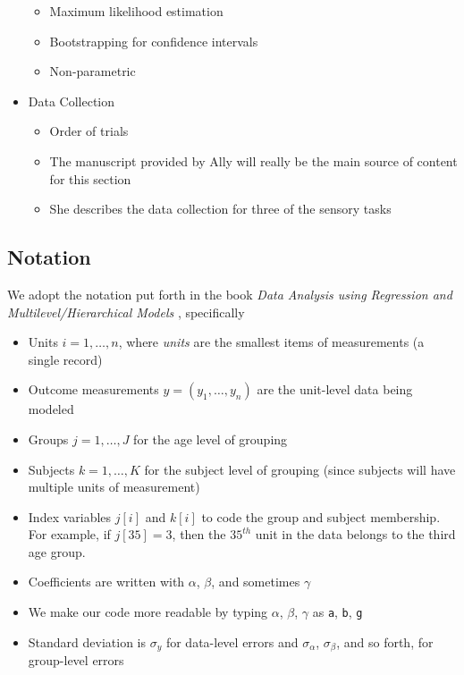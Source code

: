 \documentclass[
]{article}
\providecommand{\tightlist}{%
  \setlength{\itemsep}{0pt}\setlength{\parskip}{0pt}}
\begin{document}
\begin{itemize}
  \begin{itemize}
  \tightlist
  \item
    Maximum likelihood estimation
  \item
    Bootstrapping for confidence intervals
  \item
    Non-parametric
  \end{itemize}
\item
  Data Collection

  \begin{itemize}
  \tightlist
  \item
    Order of trials
  \item
    The manuscript provided by Ally will really be the main source of content for this section
  \item
    She describes the data collection for three of the sensory tasks
  \end{itemize}
\end{itemize}

\hypertarget{notation}{%
\subsection{Notation}\label{notation}}

We adopt the notation put forth in the book \emph{Data Analysis using Regression and Multilevel/Hierarchical Models} \citep{gelman2006data}, specifically

\begin{itemize}
\tightlist
\item
  Units \(i = 1, \ldots, n\), where \emph{units} are the smallest items of measurements (a single record)
\item
  Outcome measurements \(y = (y_1, \ldots, y_n)\) are the unit-level data being modeled
\item
  Groups \(j = 1, \ldots, J\) for the age level of grouping
\item
  Subjects \(k = 1, \ldots, K\) for the subject level of grouping (since subjects will have multiple units of measurement)
\item
  Index variables \(j[i]\) and \(k[i]\) to code the group and subject membership. For example, if \(j[35]=3\), then the \(35^{th}\) unit in the data belongs to the third age group.
\item
  Coefficients are written with \(\alpha\), \(\beta\), and sometimes \(\gamma\)
\item
  We make our code more readable by typing \(\alpha\), \(\beta\), \(\gamma\) as \texttt{a}, \texttt{b}, \texttt{g}
\item
  Standard deviation is \(\sigma_y\) for data-level errors and \(\sigma_\alpha\), \(\sigma_\beta\), and so forth, for group-level errors
\end{itemize}
\end{document}
